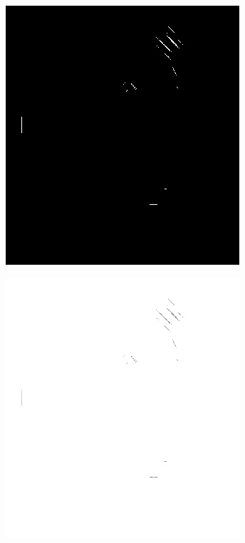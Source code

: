 \documentclass{beamer}
\begin{document}
{\begin{figure}[!ht]
\begin{subfigure}[ht]{0.15\textwidth}
        \end{subfigure}
        \qquad
        \begin{subfigure}[ht]{0.15\textwidth}
            \includegraphics[width=\textwidth]{fingerprints/2004Db2a/1_2_mask.jpg}
        \end{subfigure}
        \qquad
        \begin{subfigure}[ht]{0.15\textwidth}
            \includegraphics[width=\textwidth]{fingerprints/2004Db2a/1_2_filtered.jpg}

\end{subfigure}
\end{figure}}
\end{document}
